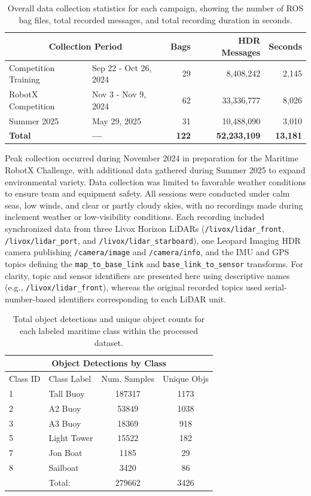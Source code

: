\documentclass{erauthesis}
\begin{document}
\begin{table}[htbp]
\centering
\begin{tabular}{llrrr}
\hline
\multicolumn{2}{c}{Collection Period} & Bags & HDR Messages & Seconds \\
\hline
\hline
Competition Training & Sep 22 - Oct 26, 2024 & 29 & 8,408,242 & 2,145 \\
RobotX Competition & Nov 3 - Nov 9, 2024 & 62 & 33,336,777 & 8,026 \\
Summer 2025  & May 29, 2025 & 31 & 10,488,090 & 3,010 \\
\hline
\textbf{Total} & \textbf{---} & \textbf{122} & \textbf{52,233,109} & \textbf{13,181} \\
\hline
\end{tabular}
\caption{Overall data collection statistics for each campaign, showing the number of ROS bag files, total recorded messages, and total recording duration in seconds.}
\label{tab:rosbag_stats}
\end{table}

Peak collection occurred during November 2024 in preparation for the Maritime RobotX Challenge, with additional data gathered during Summer 2025 to expand environmental variety.  
Data collection was limited to favorable weather conditions to ensure team and equipment safety. 
All sessions were conducted under calm seas, low winds, and clear or partly cloudy skies, with no recordings made during inclement weather or low-visibility conditions.
Each recording included synchronized data from three Livox Horizon LiDARs  (\texttt{/livox/lidar\_front}, \texttt{/livox/lidar\_port}, and  \texttt{/livox/lidar\_starboard}), one Leopard Imaging HDR camera publishing  \texttt{/camera/image} and \texttt{/camera/info}, and the IMU and GPS topics defining the  \texttt{map\_to\_base\_link} and \texttt{base\_link\_to\_sensor} transforms.
For clarity, topic and sensor identifiers are presented here using descriptive names (e.g., \texttt{/livox/lidar\_front}), whereas the original recorded topics used serial-number-based identifiers corresponding to each LiDAR unit.


\begin{table}[ht]
\centering
\begin{tabular}{llcc}
\hline
\multicolumn{4}{c}{ Object Detections by Class}\\
\hline
\hline
Class ID & Class Label       & Num. Samples & Unique Objs \\
1     & Tall Buoy   & 187317       & 1173         \\
2     & A2 Buoy     & 53849        & 1038         \\
3     & A3 Buoy     & 18369        & 918         \\
5     & Light Tower & 15522        & 182          \\
7     & Jon Boat    & 1185         & 29         \\
8     & Sailboat    & 3420         & 86  \\      
\hline
& Total: & 279662 & 3426
\end{tabular}
\caption{Total object detections and unique object counts for each labeled maritime class within the processed dataset.}
\label{tab:obj_class_dets}
\end{table}
\end{document}
